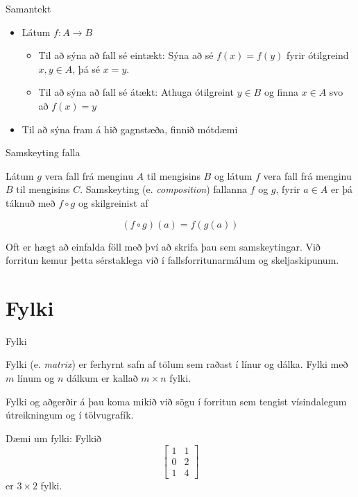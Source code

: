 \documentclass{beamer}
\begin{document}
\begin{frame}{Samantekt}
\begin{itemize}
 \item Látum $f: A \to B$
 \begin{itemize}
  \item Til að sýna að fall sé eintækt: Sýna að sé $f(x) = f(y)$ fyrir ótilgreind $x, y \in A$, þá sé $x = y$.
  \item Til að sýna að fall sé átækt: Athuga ótilgreint $y \in B$ og finna $x \in A$ svo að $f(x) = y$
 \end{itemize}
 \item Til að sýna fram á hið gagnstæða, finnið mótdæmi
\end{itemize}

\end{frame}


\begin{frame}{Samskeyting falla}
\begin{tcolorbox}[title=Samskeyting falla]
Látum $g$ vera fall frá menginu $A$ til mengisins $B$ og látum $f$ vera fall frá menginu $B$ til mengisins $C$. Samskeyting (e. \emph{composition}) fallanna $f$ og $g$, fyrir $a \in A$ er þá táknuð með $f \circ g$ og skilgreinist af

\[
 (f \circ g)(a) = f(g(a))
\]

\end{tcolorbox}
Oft er hægt að einfalda föll með því að skrifa þau sem samskeytingar. Við forritun kemur þetta sérstaklega við í fallsforritunarmálum og skeljaskipunum.
\end{frame}

\section{Fylki}

\begin{frame}{Fylki}
\begin{tcolorbox}[title=Fylki]
Fylki (e. \emph{matrix}) er ferhyrnt safn af tölum sem raðast í línur og dálka. Fylki með $m$ línum og $n$ dálkum er kallað $m \times n$ fylki.
\end{tcolorbox}
Fylki og aðgerðir á þau koma mikið við sögu í forritun sem tengist vísindalegum útreikningum og í tölvugrafík.

Dæmi um fylki: Fylkið
\[
\begin{bmatrix}
1&1\\0&2\\1&4
\end{bmatrix}
\]
er $3 \times 2$ fylki.
\end{frame}
\end{document}

